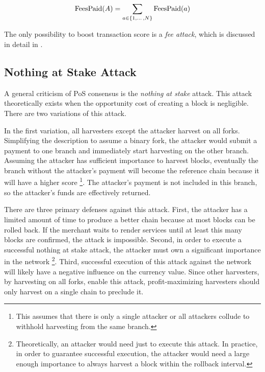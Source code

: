 \begin{equation}
\operatorname{FeesPaid}(A) = \sum\limits_{a \in \{1, \dotso, N\}} \operatorname{FeesPaid}(a)
\end{equation}

The only possibility to boost transaction score is a \emph{fee attack}, which is discussed in detail in .

\subsection{Nothing at Stake Attack}

A general criticism of PoS consensus is the \emph{nothing at stake} attack.
This attack theoretically exists when the opportunity cost of creating a block is negligible.
There are two variations of this attack.

In the first variation, all harvesters except the attacker harvest on all forks.
Simplifying the description to assume a binary fork, the attacker would submit a payment to one branch and immediately start harvesting on the other branch.
Assuming the attacker has sufficient importance to harvest blocks, eventually the branch without the attacker's payment will become the reference chain because it will have a higher score
\footnote{This assumes that there is only a single attacker or all attackers collude to withhold harvesting from the same branch.}.
The attacker's payment is not included in this branch, so the attacker's funds are effectively returned.

There are three primary defenses against this attack.
First, the attacker has a limited amount of time to produce a better chain because at most  blocks can be rolled back.
If the merchant waits to render services until at least this many blocks are confirmed, the attack is impossible.
Second, in order to execute a successful nothing at stake attack, the attacker must own a significant importance in the network
\footnote{
	Theoretically, an attacker would need just  to execute this attack.
	In practice, in order to guarantee successful execution, the attacker would need a large enough importance to always harvest a block within the rollback interval.
}.
Third, successful execution of this attack against the network will likely have a negative influence on the currency value.
Since other harvesters, by harvesting on all forks, enable this attack, profit-maximizing harvesters should only harvest on a single chain to preclude it.

